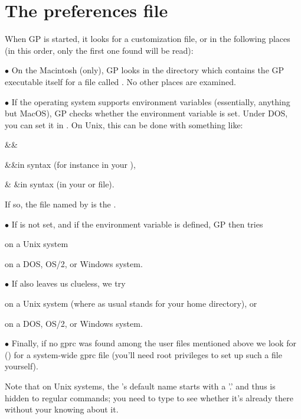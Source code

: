 \section{The preferences file}
\label{se:gprc}

\noindent
When GP is started, it looks for a customization file, or  in the
following places (in this order, only the first one found will be read):

\noindent$\bullet$ On the Macintosh (only), GP looks in the directory which
contains the GP executable itself for a file called . No other places
are examined.

\noindent$\bullet$ If the operating system supports environment variables
(essentially, anything but MacOS), GP checks whether the environment variable
 is set. Under DOS, you can set it in .
On Unix, this can be done with something like:
\smallskip

\settabs\+\indent&\quad&\cr

\+&\quad&in  syntax
(for instance in your ),\cr

\+& &in  syntax
(in your  or  file).\cr

\noindent If so, the file named by  is the .

\noindent$\bullet$ If  is not set, and if the environment variable
 is defined, GP then tries

 on a Unix system

 on a DOS, OS/2, or Windows system.

\noindent$\bullet$ If  also leaves us clueless, we try

\strut{} on a Unix system (where as usual \kbd{\til} stands for
your home directory), or

 on a DOS, OS/2, or Windows system.

\noindent$\bullet$ Finally, if no gprc was found among the user files
mentioned above we look for  ()
for a system-wide gprc file (you'll need root privileges to set up such a
file yourself).

Note that on Unix systems, the 's default name starts with a '.' and
thus is hidden to regular  commands; you need to type  to
see whether it's already there without your knowing about it.

